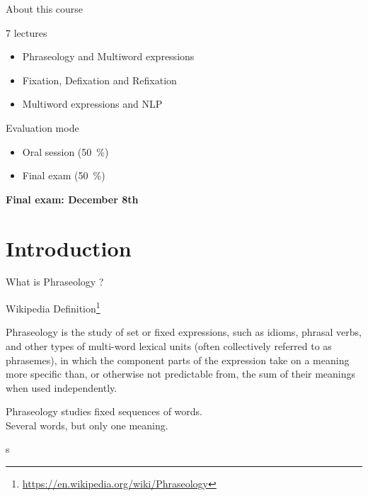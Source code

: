 \documentclass[serif, aspectratio=169]{beamer}
\begin{document}
\begin{frame}{About this course} %
    \begin{block}{7 lectures}
        \begin{itemize}
            \item Phraseology and Multiword expressions
            \item Fixation, Defixation and Refixation
            \item Multiword expressions and NLP
        \end{itemize}
    \end{block}
    \pause
    \vfill
    \begin{block}{Evaluation mode}
        \begin{itemize}
            \item Oral session (50~\%) 
            \item Final exam (50~\%)
        \end{itemize}
    \end{block}
    \pause
    \vfill
    \hfill \textbf{Final exam: December 8th}
\end{frame}



\section{Introduction}

\begin{frame}{What is Phraseology ?}
    \pause
    \begin{block}{Wikipedia Definition\footnote{\url{https://en.wikipedia.org/wiki/Phraseology}}}
        \begin{tcolorbox}
            Phraseology is the study of set or fixed expressions, such as idioms, phrasal verbs, and other types of multi-word lexical units (often collectively referred to as phrasemes), in which the component parts of the expression take on a meaning more specific than, or otherwise not predictable from, the sum of their meanings when used independently.
        \end{tcolorbox}
    \end{block}
    \vfill
    \pause
    \begin{center}
        \Large
        Phraseology studies fixed sequences of words. \\
        Several words, but only one meaning.
    \end{center}s
\end{frame}
\end{document}
